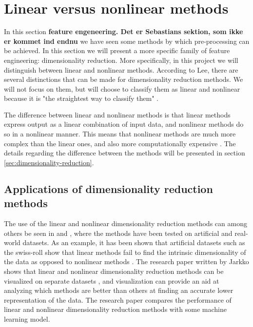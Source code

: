 \section{Linear versus nonlinear methods}\label{sec:linear-vs-nonlinear}

In this section \textbf{feature engeneering. Det er Sebastians sektion, som ikke er kommet ind endnu} we have seen some methods by which pre-processing can be achieved. In this section we will present a more specific family of feature engineering: dimensionality reduction. More specifically, in this project we will distinguish between linear and nonlinear methods. According to Lee, there are several distinctions that can be made for dimensionality reduction methods. We will not focus on them, but will choose to classify them as linear and nonlinear because it is "the straightest way to classify them" \cite{nonlinear-dim-red-chapter-two}.


The difference between linear and nonlinear methods is that linear methods express output as a linear combination of input data, and nonlinear methods do so in a nonlinear manner. This means that nonlinear methods are much more complex than the linear ones, and also more computationally expensive \cite{nonlinear-dim-red-chapter-two}. The details regarding the difference between the methods will be presented in section \ref{sec:dimensionality-reduction}.

\subsection{Applications of dimensionality reduction methods}
The use of the linear and nonlinear dimensionality reduction methods can among others be seen in \cite{dimensionality-reduction-comparative-review} and \cite{tennenbaum}, where the methods have been tested on artificial and real-world datasets. As an example, it has been shown that artificial datasets such as the swiss-roll show that linear methods fail to find the intrinsic dimensionality of the data as opposed to nonlinear methods \cite{tennenbaum}. The research paper written by Jarkko shows that linear and nonlinear dimensionality reduction methods can be visualized on separate datasets \cite{dim-red-visual}, and visualization can provide an aid at analyzing which methods are better than others at finding an accurate lower representation of the data. The research paper \cite{dimensionality-reduction-comparative-review} compares the performance of linear and nonlinear dimensionality reduction methods with some machine learning model.


